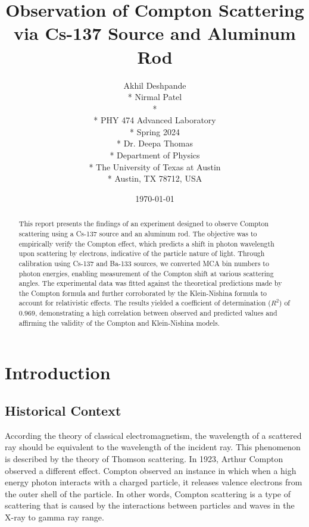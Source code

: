\documentclass[10pt,letterpaper,onecolumn]{article}
\begin{document}

\title{Observation of Compton Scattering via Cs-137 Source and Aluminum Rod}
\author{
 Akhil Deshpande \\*
 Nirmal Patel \\*
 \\*
 PHY 474 Advanced Laboratory \\*
 Spring 2024 \\*
 Dr. Deepa Thomas \\*
 Department of Physics \\*
 The University of Texas at Austin \\*
 Austin, TX 78712, USA
}
\date{\today}
\maketitle
\begin{abstract}
    This report presents the findings of an experiment designed to observe Compton scattering using a Cs-137 source and an aluminum rod. The objective was to empirically verify the Compton effect, which predicts a shift in photon wavelength upon scattering by electrons, indicative of the particle nature of light. Through calibration using Cs-137 and Ba-133 sources, we converted MCA bin numbers to photon energies, enabling measurement of the Compton shift at various scattering angles. The experimental data was fitted against the theoretical predictions made by the Compton formula and further corroborated by the Klein-Nishina formula to account for relativistic effects. The results yielded a coefficient of determination (\(R^2\)) of 0.969, demonstrating a high correlation between observed and predicted values and affirming the validity of the Compton and Klein-Nishina models.
\end{abstract}
\section{Introduction}
\subsection{Historical Context}
According the theory of classical electromagnetism, the wavelength of a scattered ray should be equivalent to the wavelength of the incident ray. This phenomenon is described by the theory of Thomson scattering. In 1923, Arthur Compton observed a different effect. Compton observed an instance in which when a high energy photon interacts with a charged particle, it releases valence electrons from the outer shell of the particle. In other words, Compton scattering is a type of scattering that is caused by the interactions between particles and waves in the X-ray to gamma ray range. 
\end{document}
